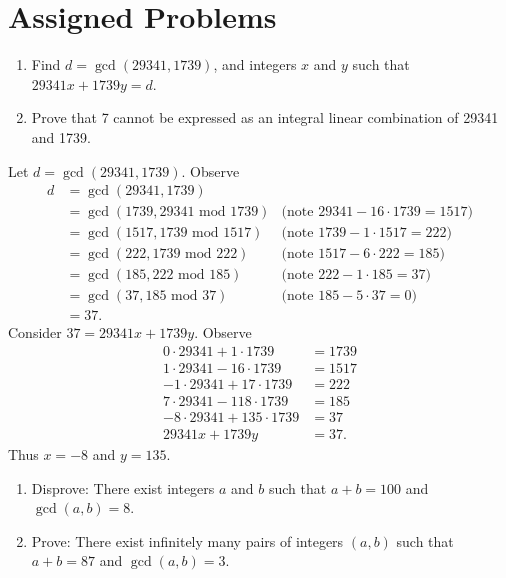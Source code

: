 \documentclass{article}
\newcommand{\modulo}{\text{ mod }}
\theoremstyle{definition}
\begin{document}
\section*{Assigned Problems}
\begin{question}
    \begin{enumerate}
        \item Find $d = \gcd(29341,1739)$, and integers $x$ and $y$ such that $29341x + 1739y = d$.
        \item Prove that 7 cannot be expressed as an integral linear combination of 29341 and 1739.
    \end{enumerate}
\end{question}
\begin{solution}
Let $d=\gcd(29341,1739)$. Observe
\begin{align*}
d
&=\gcd(29341,1739)\\
&=\gcd(1739,29341 \modulo 1739)&\text{(note }29341-16\cdot 1739=1517\text{)}\\
&=\gcd(1517,1739 \modulo 1517)&\text{(note }1739-1\cdot 1517=222\text{)}\\
&=\gcd(222,1739 \modulo 222)&\text{(note }1517-6\cdot 222=185\text{)}\\
&=\gcd(185,222 \modulo 185)&\text{(note }222-1\cdot 185=37\text{)}\\
&=\gcd(37,185 \modulo 37)&\text{(note }185-5\cdot 37=0\text{)}\\
&=37.
\end{align*}
Consider $37=29341x+1739y$. Observe
\begin{align*}
0\cdot 29341+1\cdot 1739&=1739\\
1\cdot 29341-16\cdot 1739&=1517\\
-1\cdot 29341+17\cdot 1739&=222\\
7\cdot 29341-118\cdot 1739&=185\\
-8\cdot 29341+135\cdot 1739&=37\\
29341x+1739y&=37.
\end{align*}
Thus $x=-8$ and $y=135$.
\end{solution}
\begin{question}
    \begin{enumerate}
        \item Disprove: There exist integers $a$ and $b$ such that $a+b=100$ and $\gcd(a, b)=8$.
        \item Prove: There exist infinitely many pairs of integers $(a,b)$ such that $a+b=87$ and $\gcd(a, b)=3$.
    \end{enumerate}
\end{question}
\begin{solution}
\end{solution}
\end{document}
